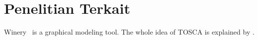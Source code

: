 \section{Penelitian Terkait}
\label{sec:penelitianterkait}

Winery~\cite{Winery} is a graphical modeling tool.
The whole idea of TOSCA is explained by \citet{Binz2009}.

\lipsum[1-3]
